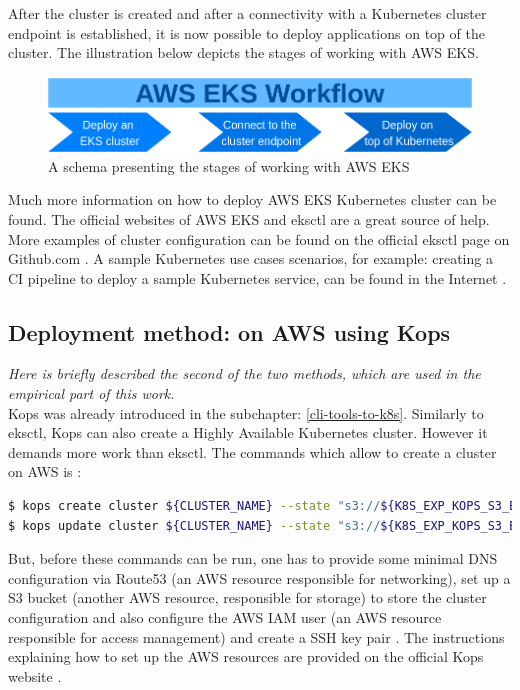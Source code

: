 After the cluster is created and after a connectivity with a Kubernetes cluster endpoint is established, it is now possible to deploy applications on top of the cluster. The illustration below depicts the stages of working with AWS EKS.
\begin{figure}[H]
    \centering
    \includegraphics[width=12cm]{figures/eks-workflow.png}
    \captionsetup{justification=centering,margin=2cm}
    \caption{A schema presenting the stages of working with AWS EKS}
\end{figure}

Much more information on how to deploy AWS EKS Kubernetes cluster can be found. The official websites of AWS EKS \cite{what-is-eks} and eksctl \cite{eksctl} are a great source of help. More examples of cluster configuration can be found on the official eksctl page on Github.com \cite{eks-gh}. A sample Kubernetes use cases scenarios, for example: creating a CI pipeline to deploy a sample Kubernetes service, can be found in the Internet \cite{eksworkshop}.


\subsection{Deployment method: on AWS using Kops}
\textit{Here is briefly described the second of the two methods, which are used in the empirical part of this work.}
\\

Kops was already introduced in the subchapter: \ref{cli-tools-to-k8s}. Similarly to eksctl, Kops can also create a Highly Available Kubernetes cluster. However it demands more work than eksctl. The commands which allow to create a cluster on AWS is \cite{book-mastering-k8s}:
\begin{lstlisting}[basicstyle=\small,caption={The commands of Kops CLI tool used to create a Kubernetes cluster configuration and then to deploy the cluster},captionpos=b,language=Bash,xleftmargin=1cm]
$ kops create cluster ${CLUSTER_NAME} --state "s3://${K8S_EXP_KOPS_S3_BUCKET}" --cloud=aws --zones=us-east-1c
$ kops update cluster ${CLUSTER_NAME} --state "s3://${K8S_EXP_KOPS_S3_BUCKET}" --yes
\end{lstlisting}
But, before these commands can be run, one has to provide some minimal DNS configuration via Route53 (an AWS resource responsible for networking), set up a S3 bucket (another AWS resource, responsible for storage) to store the cluster configuration \cite{book-mastering-k8s} and also configure the AWS IAM user (an AWS resource responsible for access management) and create a SSH key pair \cite{online-kops-aws}. The instructions explaining how to set up the AWS resources are provided on the official Kops website \cite{online-kops-aws}.

